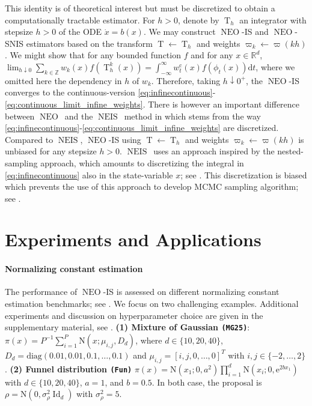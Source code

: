 \documentclass{article}
\def\Normal{\mathrm{N}}
\def\IFIS{\ensuremath{\operatorname{NEO}}}
\def\InFiNE{{\small \IFIS}}
\def\NEO{{\small \IFIS}}
\def\transfo{\operatorname{T}}
\def\rmd{\operatorname{d}\hspace{-2pt}}
\def\Id{\operatorname{Id}}
\def\rset{\mathbb{R}}
\def\rmd{\mathrm{d}}
\newcommand{\1}{\mathds{1}}
\def\Id{\operatorname{Id}}
\def\Id{\operatorname{Id}}
\def\target{\pi}
\def\rset{\mathbb{R}}
\def\zset{\mathbb{Z}}
\def\rmd{\mathrm{d}}
\def\rme{\mathrm{e}}
\def\NEIS{\ensuremath{\operatorname{NEIS}}}
\def\wcont{w_t^\mathrm{c}}
\begin{document}
This identity is of theoretical interest but must be discretized to obtain a  computationally tractable estimator. For  $h>0$, denote by $\transfo_h$  an integrator with stepsize $h > 0$ of the ODE $\dot{x} = b(x)$. We may construct \InFiNE-IS and \InFiNE-SNIS estimators based on the transform $\transfo \leftarrow\transfo_h$ and weights $\varpi_{k} \leftarrow {\varpi(kh)}$. 
We might show that for any bounded function $f$ and for any $x\in\rset^d$, 
$\lim_{h\downarrow0}\sum_{k\in\zset} w_{k}(x) f(\transfo^k_h(x)) = \int_{-\infty}^\infty \wcont(x)f(\phi_t(x))\rmd t$, where we omitted here the dependency in $h$ of $w_k$.
Therefore, taking $h \downarrow 0^+$, the  \NEO-IS converges to the continuous-version \eqref{eq:infinecontinuous}-\eqref{eq:continuous_limit_infine_weights}. 
There is however an important difference between \IFIS\ and the  \NEIS\ method in \cite{rotskoff:vanden-eijden:2019}  which stems from the way \eqref{eq:infinecontinuous}-\eqref{eq:continuous_limit_infine_weights} are discretized. Compared to \NEIS, \NEO-IS using $\transfo \leftarrow\transfo_h$ and weights $\varpi_{k} \leftarrow {\varpi(kh)}$ is unbiased for any stepsize $h > 0$. \NEIS\ uses an approach inspired by the nested-sampling approach, which amounts to discretizing the integral in \eqref{eq:infinecontinuous} also in the state-variable $x$; see \cite{skilling2006nested,chopin:robert:2010}. This discretization is biased which prevents the use of this approach to develop MCMC sampling algorithm; see .  
 
\section{Experiments and Applications}
\paragraph{Normalizing constant estimation}
\label{subsec:estim_constant}
The performance of \IFIS-IS is assessed on different normalizing constant  estimation benchmarks; see \cite{jia2020normalizing}. 
We focus on two challenging examples. Additional experiments and discussion on hyperparameter choice are given in the supplementary material, see . 
\textbf{(1) Mixture of Gaussian \texttt{(MG25)}}: $\target(x)= P^{-1} \sum_{i=1}^{P} \Normal(x;\mu_{i,j},D_d)$, where $d\in\{10,20,40\}$, $D_d= \mathrm{diag}(0.01,0.01,0.1,\dots,0.1)$ and $\mu_{i,j}= [i,j,0,\ldots,0]^T$ with $i,j \in \{-2,\ldots, 2\}$.  \textbf{(2) Funnel distribution \texttt{(Fun)}} $\target(x)= \Normal(x_1;0,a^2)\prod_{i=1}^d \Normal(x_i;0,\rme^{2b x_1})$ with $d\in\{10,20,40\}$, $a=1$, and $b=0.5$. In both case, the proposal is $\rho= \Normal(0,\sigma^2_\rho \Id_d)$ with $\sigma^2_\rho=5$. 
\end{document}
